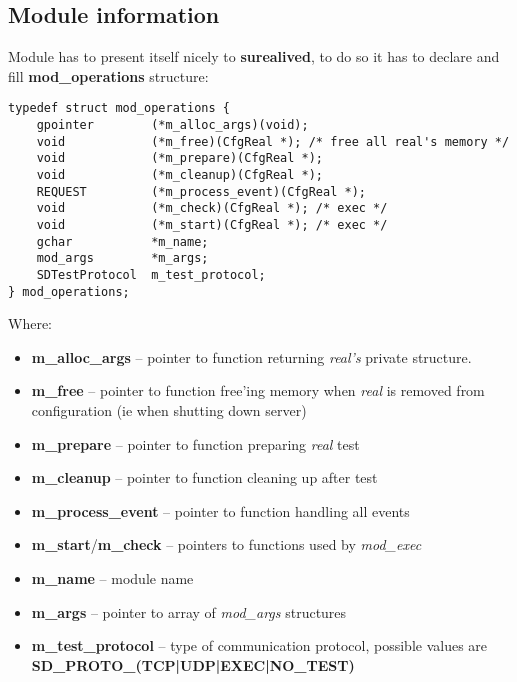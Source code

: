 \documentclass[polish,12pt]{article}
\begin{document}
\subsection{Module information}
Module has to present itself nicely to \textbf{surealived}, to do so it has to declare
and fill \textbf{mod\_operations} structure:
{\small
\begin{verbatim}
typedef struct mod_operations {
    gpointer        (*m_alloc_args)(void);
    void            (*m_free)(CfgReal *); /* free all real's memory */
    void            (*m_prepare)(CfgReal *);
    void            (*m_cleanup)(CfgReal *);
    REQUEST         (*m_process_event)(CfgReal *);
    void            (*m_check)(CfgReal *); /* exec */
    void            (*m_start)(CfgReal *); /* exec */
    gchar           *m_name;
    mod_args        *m_args;
    SDTestProtocol  m_test_protocol;
} mod_operations;
\end{verbatim}
}
Where:
\begin{itemize}
  \item \textbf{m\_alloc\_args} -- pointer to function returning \textit{real's} private structure.
  \item \textbf{m\_free} -- pointer to function free'ing memory when \textit{real} is removed
    from configuration (ie when shutting down server)
  \item \textbf{m\_prepare} -- pointer to function preparing \textit{real} test
  \item \textbf{m\_cleanup} -- pointer to function cleaning up after test
  \item \textbf{m\_process\_event} -- pointer to function handling all events
  \item \textbf{m\_start}/\textbf{m\_check} -- pointers to functions used by \textit{mod\_exec}
  \item \textbf{m\_name} -- module name
  \item \textbf{m\_args} -- pointer to array of \textit{mod\_args} structures
  \item \textbf{m\_test\_protocol} -- type of communication protocol,
    \newline
    possible values are \textbf{SD\_PROTO\_(TCP|UDP|EXEC|NO\_TEST)}
\end{itemize}
\newpage
\end{document}
